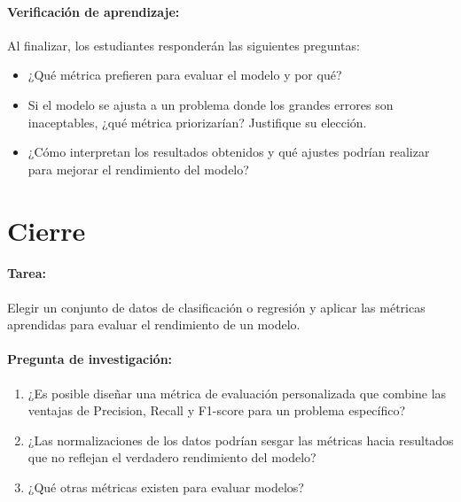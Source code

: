 \documentclass[a4,11pt]{aleph-notas}
\begin{document}
\paragraph{Verificación de aprendizaje:}  
Al finalizar, los estudiantes responderán las siguientes preguntas:
\begin{itemize}
    \item ¿Qué métrica prefieren para evaluar el modelo y por qué?
    \item Si el modelo se ajusta a un problema donde los grandes errores son inaceptables, ¿qué métrica priorizarían? Justifique su elección.
    \item ¿Cómo interpretan los resultados obtenidos y qué ajustes podrían realizar para mejorar el rendimiento del modelo?
\end{itemize}


\section*{Cierre}

\paragraph{Tarea:} Elegir un conjunto de datos de clasificación o regresión y aplicar las métricas aprendidas para evaluar el rendimiento de un modelo.
    
    
\paragraph{Pregunta de investigación:} 
\begin{enumerate}
    \item ¿Es posible diseñar una métrica de evaluación personalizada que combine las ventajas de Precision, Recall y F1-score para un problema específico?
    \item ¿Las normalizaciones de los datos podrían sesgar las métricas hacia resultados que no reflejan el verdadero rendimiento del modelo?
    \item ¿Qué otras métricas existen para evaluar modelos?

\end{enumerate}
    
\end{document}
